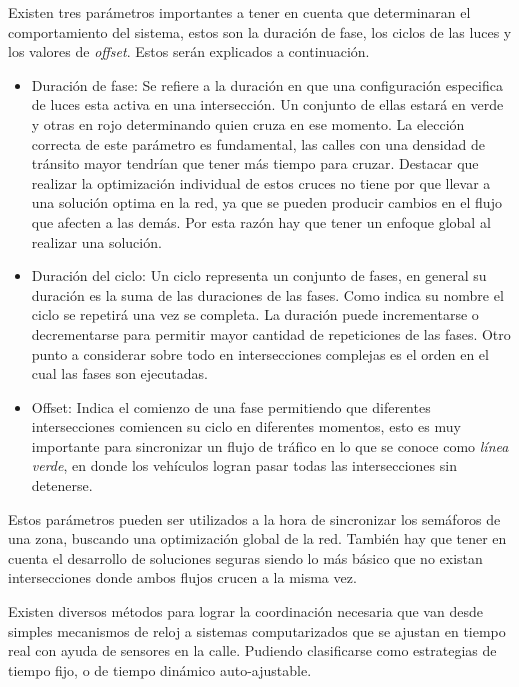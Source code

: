 Existen tres parámetros importantes a tener en cuenta que determinaran el comportamiento del sistema, estos son la duración de fase, los ciclos de las luces y los valores de \emph{offset}. Estos serán explicados a continuación.


\begin{itemize}
 	\item Duración de fase: Se refiere a la duración en que una configuración especifica de luces esta activa en una intersección. Un conjunto de ellas estará en verde y otras en rojo determinando quien cruza en ese momento. La elección correcta de este parámetro es fundamental, las calles con una densidad de tránsito mayor tendrían que tener más tiempo para cruzar. Destacar que realizar la optimización individual de estos cruces no tiene por que llevar a una solución optima en la red, ya que se pueden producir cambios en el flujo que afecten a las demás. Por esta razón hay que tener un enfoque global al realizar una solución.
 	
 	\item Duración del ciclo: Un ciclo representa un conjunto de fases, en general su duración es la suma de las duraciones de las fases. Como indica su nombre el ciclo se repetirá una vez se completa. La duración puede incrementarse o decrementarse para permitir mayor cantidad de repeticiones de las fases. Otro punto a considerar sobre todo en intersecciones complejas es el orden en el cual las fases son ejecutadas.
 	
 	\item Offset: Indica el comienzo de una fase permitiendo que diferentes intersecciones comiencen su ciclo en diferentes momentos, esto es muy importante para sincronizar un flujo de tráfico en lo que se conoce como \emph{línea verde}, en donde los vehículos logran pasar todas las intersecciones sin detenerse.
\end{itemize}

Estos parámetros pueden ser utilizados a la hora de sincronizar los semáforos de una zona, buscando una optimización global de la red. También hay que tener en cuenta el desarrollo de soluciones seguras siendo lo más básico que no existan intersecciones donde ambos flujos crucen a la misma vez.

Existen diversos métodos para lograr la coordinación necesaria que van desde simples mecanismos de reloj a sistemas computarizados que se ajustan en tiempo real con ayuda de sensores en la calle. Pudiendo clasificarse como estrategias de tiempo fijo, o de tiempo dinámico auto-ajustable.

